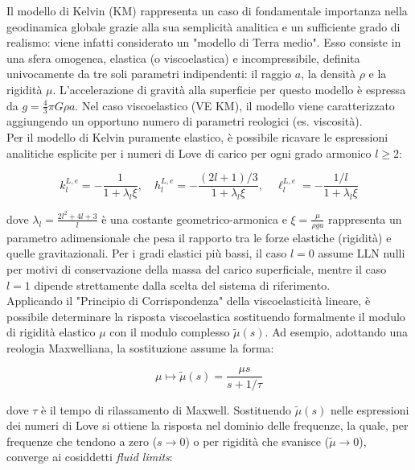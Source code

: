 \documentclass[a4paper,12pt]{book}
\begin{document}
Il modello di Kelvin (KM) rappresenta un caso di fondamentale importanza nella geodinamica globale grazie alla sua semplicità analitica e un sufficiente grado di realismo:
viene infatti considerato un "modello di Terra medio".
Esso consiste in una sfera omogenea, elastica (o viscoelastica) e incompressibile, definita univocamente da tre soli parametri indipendenti:
il raggio $a$, la densità $\rho$ e la rigidità $\mu$.
L'accelerazione di gravità alla superficie per questo modello è espressa da $g = \frac{4}{3}\pi G \rho a$.
Nel caso viscoelastico (VE KM), il modello viene caratterizzato aggiungendo un opportuno numero di parametri reologici (es. viscosità).\\

\noindent
Per il modello di Kelvin puramente elastico, è possibile ricavare le espressioni analitiche esplicite per i numeri di Love di carico per ogni grado armonico $l \ge 2$:

\begin{equation}
    k_l^{L,e} = -\frac{1}{1 + \lambda_l \xi}, \quad h_l^{L,e} = -\frac{(2l + 1)/3}{1 + \lambda_l \xi}, \quad \ell_l^{L,e} = -\frac{1/l}{1 + \lambda_l \xi}
\end{equation}

\noindent
dove $\lambda_l = \frac{2l^2 + 4l + 3}{l}$ è una costante geometrico-armonica e $\xi = \frac{\mu}{\rho g a}$ rappresenta un parametro adimensionale che pesa il rapporto tra le forze elastiche (rigidità) e quelle gravitazionali.
Per i gradi elastici più bassi, il caso $l=0$ assume LLN nulli per motivi di conservazione della massa del carico superficiale, mentre il caso $l=1$ dipende strettamente dalla scelta del sistema di riferimento.\\

\noindent
Applicando il "Principio di Corrispondenza" della viscoelasticità lineare, è possibile determinare la risposta viscoelastica sostituendo formalmente il modulo di rigidità elastico $\mu$ con il modulo complesso $\tilde{\mu}(s)$.
Ad esempio, adottando una reologia Maxwelliana, la sostituzione assume la forma:

\begin{equation}
    \mu \longmapsto \tilde{\mu}(s) = \frac{\mu s}{s + 1/\tau}
\end{equation}

\noindent
dove $\tau$ è il tempo di rilassamento di Maxwell.
Sostituendo $\tilde{\mu}(s)$ nelle espressioni dei numeri di Love si ottiene la risposta nel dominio delle frequenze, la quale, per frequenze che tendono a zero ($s \to 0$) o per rigidità che svanisce ($\tilde{\mu} \to 0$),
converge ai cosiddetti \textit{fluid limits}:
\end{document}
